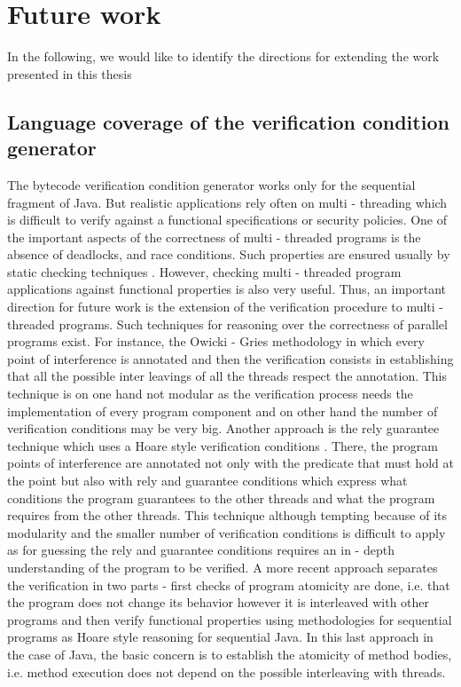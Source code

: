 \section{Future work}
In the following, we would like to identify the directions for extending the work presented in this thesis

\subsection{Language coverage of the verification condition generator}
The bytecode verification condition generator works only for the sequential fragment of Java. But realistic applications 
rely often on multi - threading which is difficult to verify against a functional specifications or security policies.
One of the important aspects of the correctness of multi - threaded programs is the absence of deadlocks, 
and race conditions. Such properties are ensured usually by static checking techniques \cite{}. 
  However, checking multi - threaded
 program applications against functional properties is also very useful. 
 Thus, an important direction for future work is the extension of the verification procedure to multi - threaded programs. Such techniques for reasoning over
the correctness of parallel programs  exist.
 For instance, the Owicki - Gries methodology \cite{nipkow99owickigries}  in which every point of interference is annotated and then the verification consists in establishing that
 all the possible inter leavings of all the threads respect the annotation. This technique is on one hand not modular as the verification process 
needs the implementation of every program component and on other hand the number of verification conditions may be very big.
 Another approach is the rely guarantee technique which uses a Hoare style verification conditions \cite{nieto03relyguarantee}.
There, the program points of interference are annotated not only with the predicate that must hold
at the point but also with rely and guarantee  conditions which express what conditions the program guarantees to the other threads and what 
the program requires from the other threads. This technique although tempting because of its modularity and the smaller number of verification conditions is difficult to apply
as for guessing the rely and guarantee conditions requires an in - depth understanding of the program to be verified.  
A more recent approach separates the verification in two parts - first checks of program atomicity  \cite{TES03CF} are done, i.e. that the program does not change its behavior however
it is interleaved with other programs   and then verify functional properties using  methodologies for sequential programs as Hoare style reasoning for sequential Java. 
In this last approach in the case of Java, the basic concern is to establish the atomicity of method bodies, i.e. method 
execution does not depend on the possible interleaving with threads.




